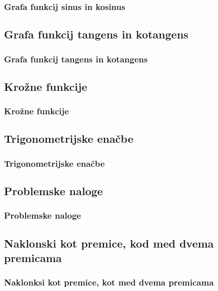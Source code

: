         \begin{frame}
            \frametitle{Grafa funkcij sinus in kosinus}
        \end{frame}

    \subsection{Grafa funkcij tangens in kotangens}

        \begin{frame}
            \frametitle{Grafa funkcij tangens in kotangens}
        \end{frame}

    \subsection{Krožne funkcije}

        \begin{frame}
            \frametitle{Krožne funkcije}
        \end{frame}

    \subsection{Trigonometrijske enačbe}

        \begin{frame}
            \frametitle{Trigonometrijske enačbe}
        \end{frame}

    \subsection{Problemske naloge}

        \begin{frame}
            \frametitle{Problemske naloge}
        \end{frame}

    \subsection{Naklonski kot premice, kod med dvema premicama}
        
        \begin{frame}
            \frametitle{Naklonksi kot premice, kot med dvema premicama}
        \end{frame}